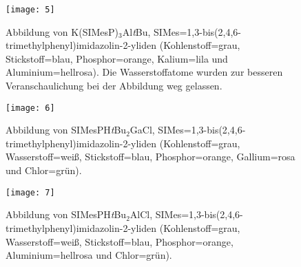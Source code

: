 \begin{figure}[ht!]
	\centering
	\texttt{[image: 5]}
	\captionsetup{figurewithin = chapter}
	\captionsetup{font=small, labelfont=bf}\caption[Abbildung von K(SIMesP)$_3$Al\textit{t}Bu]{Abbildung von K(SIMesP)$_3$Al\textit{t}Bu, SIMes=1,3-bis(2,4,6-tri\-me\-thyl\-phe\-nyl)imi\-da\-zo\-lin-2-yli\-den (Kohlenstoff=grau, Stickstoff=blau, Phosphor=orange, Kalium=lila und Aluminium=hellrosa). Die Wasserstoffatome wurden zur besseren Veranschaulichung bei der Abbildung weg gelassen.}
\label{abb:cvh5}
\end{figure}

\begin{figure}[ht!]
	\centering
	\texttt{[image: 6]}
	\captionsetup{figurewithin = chapter}
	\captionsetup{font=small, labelfont=bf}\caption[Abbildung von SIMesPH\textit{t}Bu$_2$GaCl]{Abbildung von SIMesPH\textit{t}Bu$_2$GaCl, SIMes=1,3-bis(2,4,6-tri\-me\-thyl\-phe\-nyl)imi\-da\-zo\-lin-2-yli\-den (Kohlenstoff=grau, Wasserstoff=weiß, Stickstoff=blau, Phosphor=orange, Gallium=rosa und Chlor=grün).}
\label{abb:cvh6}
\end{figure}

\begin{figure}[ht!]
	\centering
	\texttt{[image: 7]}
	\captionsetup{figurewithin = chapter}
	\captionsetup{font=small, labelfont=bf}\caption[Abbildung von SIMesPH\textit{t}Bu$_2$AlCl]{Abbildung von SIMesPH\textit{t}Bu$_2$AlCl, SIMes=1,3-bis(2,4,6-tri\-me\-thyl\-phe\-nyl)imi\-da\-zo\-lin-2-yli\-den (Kohlenstoff=grau, Wasserstoff=weiß, Stickstoff=blau, Phosphor=orange, Aluminium=hellrosa und Chlor=grün).}
\label{abb:cvh7}
\end{figure}


